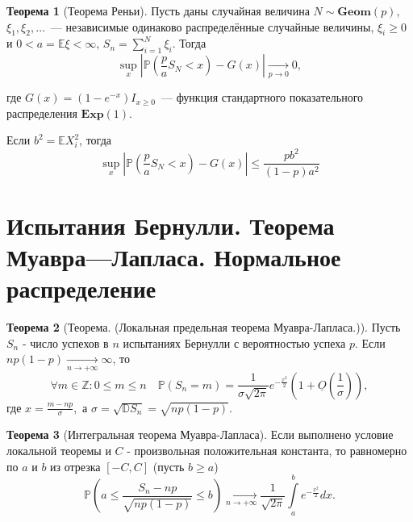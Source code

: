 \documentclass[oneside,final,14pt]{extreport}
\theoremstyle{plain}
\theoremstyle{definition}
\theoremstyle{named}
\newtheorem*{namedthm}{Теорема}
\begin{document}
\begin{namedthm}[Теорема Реньи]
Пусть даны случайная величина $N \sim \mathbf{Geom}(p)$, $\xi_1, \xi_2, \ldots$~--- независимые одинаково распределённые случайные величины, $\xi_i \geqslant 0$ и $0 < a = \mathbb{E}\xi < \infty$, $S_n = \sum\limits_{i=1}^N \xi_i$. Тогда
\begin{equation*}
    \sup\limits_{x}\left|\mathbb{P}\left(\frac{p}{a} S_{N}<x\right)-G(x)\right| \underset{p \rightarrow 0}{\longrightarrow} 0,
\end{equation*}

где $G(x)=\left(1-e^{-x}\right) I_{x \geqslant 0}$~--- функция стандартного показательного распределения $\mathbf{Exp}(1)$.

Если $b^2 = \mathbb{E}X_i^2$, тогда
\begin{equation*}
    \sup\limits_{x}\left|\mathbb{P}\left(\frac{p}{a} S_{N}<x\right)-G(x)\right| \leqslant \frac{p b^{2}}{(1-p) a^{2}}
\end{equation*}
\end{namedthm}

\section{Испытания Бернулли. Теорема Муавра—Лапласа. Нормальное распределение}

\begin{namedthm} [Теорема. (Локальная предельная теорема Муавра-Лапласа.)]
    Пусть $S_n$ - число успехов в $n$ испытаниях Бернулли с вероятностью успеха $p$. Если $n p(1-p) \underset{n \to +\infty}{\longrightarrow} \infty$, то
$$\forall m \in \mathbb{Z}: 0 \leqslant m \leqslant n \quad \mathbb{P}\left(S_{n}=m\right)=\frac{1}{\sigma \sqrt{2 \pi} } e^{-\frac{x^{2}}{2}}\left(1+\underline{O}\left(\frac{1}{\sigma}\right)\right),$$
где $x = \frac{m - np}{\sigma},$ а $\sigma=\sqrt{\mathbb{D} S_{n}}=\sqrt{n p(1-p)}$.
\end{namedthm}  

\begin{namedthm}[Интегральная теорема Муавра-Лапласа]
Если выполнено условие локальной теоремы и $C$ - произвольная положительная константа, то равномерно по $a$ и $b$ из отрезка $[-C,C]$ (пусть $b \geqslant a$)
$$\mathbb{P}\left(a \leqslant \frac{S_{n}-n p}{\sqrt{n p(1-p)}} \leqslant b\right) \underset{n \to +\infty}{\longrightarrow} \frac{1}{\sqrt{2 \pi}} \int\limits_{a}^{b} e^{-\frac{x^{2}}{2}} d x.$$
\end{namedthm} 
\end{document}
